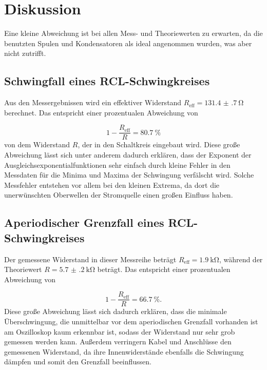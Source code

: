 \newpage

\section{Diskussion}
\label{sec:Diskussion}

Eine kleine Abweichung ist bei allen Mess- und Theoriewerten zu erwarten,
da die benutzten Spulen und Kondensatoren als ideal angenommen wurden, was
aber nicht zutrifft.

\subsection{Schwingfall eines RCL-Schwingkreises}

Aus den Messergebnissen wird ein effektiver Widerstand
$R_\text{eff} = \SI{131.4(7)}{\ohm}$ berechnet. Das entspricht einer
prozentualen Abweichung von

\begin{equation}
  1 - \frac{R_\text{eff}}{R} = \SI{80.7}{\percent}
\end{equation}
von dem Widerstand $R$, der in den Schaltkreis eingebaut wird.
Diese große Abweichung lässt sich unter anderem dadurch erklären, dass
der Exponent der Ausgleichsexponentialfunktionen sehr einfach durch kleine
Fehler in den Messdaten für die Minima und Maxima der Schwingung verfälscht
wird. Solche Messfehler entstehen vor allem bei den kleinen Extrema, da
dort die unerwünschten Oberwellen der Stromquelle einen großen Einfluss
haben.


\subsection{Aperiodischer Grenzfall eines RCL-Schwingkreises}

Der gemessene Widerstand in dieser Messreihe beträgt $R_\text{eff} =
\SI{1.9}{\kilo\ohm}$, während der Theoriewert
$R = \SI{5.7(2)}{\kilo\ohm}$ beträgt.
Das entspricht einer prozentualen Abweichung von

\begin{equation}
  1 - \frac{R_\text{eff}}{R} = \SI{66.7}{\percent}.
\end{equation}
Diese große Abweichung lässt sich dadurch erklären, dass die minimale
Überschwingung, die unmittelbar vor dem aperiodischen Grenzfall vorhanden ist
am Oszilloskop kaum erkennbar ist, sodass der Widerstand nur sehr grob
gemessen werden kann.
Außerdem verringern Kabel und Anschlüsse den gemessenen Widerstand, da ihre
Innenwiderstände ebenfalls die Schwingung dämpfen und somit den Grenzfall
beeinflussen.



